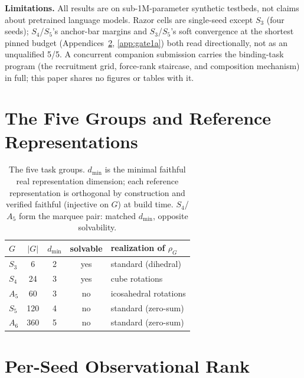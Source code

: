\documentclass[mlabstract,onecolumn]{jmlr}
\newcommand{\dmin}{d_{\min}}
\begin{document}
\textbf{Limitations.} All results are on sub-1M-parameter synthetic
testbeds, not claims about pretrained language models. Razor cells are
single-seed except $S_3$ (four seeds); $S_4$/$S_5$'s anchor-bar margins
and $S_3$/$S_5$'s soft convergence at the shortest pinned budget
(Appendices~\ref{app:m1}, \ref{app:gate1a}) both read directionally, not
as an unqualified 5/5. A concurrent companion submission carries the
binding-task program (the recruitment grid, force-rank staircase, and
composition mechanism) in full; this paper shares no figures or tables
with it.

\appendix

\section{The Five Groups and Reference Representations}
\label{app:groups}

\begin{table}[h]
\centering
\small
\begin{tabular}{lcccl}
\toprule
$G$ & $|G|$ & $\dmin$ & solvable & realization of $\rho_G$ \\
\midrule
$S_3$ & 6   & 2 & yes & standard (dihedral) \\
$S_4$ & 24  & 3 & yes & cube rotations \\
$A_5$ & 60  & 3 & no  & icosahedral rotations \\
$S_5$ & 120 & 4 & no  & standard (zero-sum) \\
$A_6$ & 360 & 5 & no  & standard (zero-sum) \\
\bottomrule
\end{tabular}
\caption{The five task groups. $\dmin$ is the minimal faithful real
representation dimension; each reference representation is orthogonal by
construction and verified faithful (injective on $G$) at build time.
$S_4$/$A_5$ form the marquee pair: matched $\dmin$, opposite solvability.}
\label{tab:groups}
\end{table}

\section{Per-Seed Observational Rank}
\label{app:m1}
\end{document}
